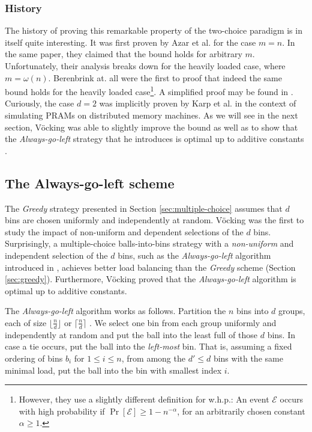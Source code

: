 \documentclass[a4paper,12pt]{article}
\begin{document}
\subsubsection{History}
\label{sec:historyOfGreedy}
The history of proving this remarkable property of the two-choice paradigm is in itself quite interesting. It was first proven by Azar et al. \cite{ABKU99} for the case $m = n$. In the same paper, they claimed that the bound holds for arbitrary $m$. Unfortunately, their analysis breaks down for the heavily loaded case, where $m = \omega\left(n\right)$. Berenbrink at. all \cite{BFZR08} were the first to proof that indeed the same bound holds for the heavily loaded case\footnote{However, they use a slightly different definition for w.h.p.: An event $\mathcal E$ occurs with high probability if $\Pr\left[\mathcal E \right]  \geq 1- n^{-\alpha}$, for an arbitrarily chosen constant $\alpha \geq 1$.}. A simplified proof may be found in \cite{TW13}. Curiously, the case $d = 2$ was implicitly proven by Karp et al. in the context of simulating PRAMs on distributed memory machines\cite{KLM92}. As we will see in the next section, V\"ocking was able to slightly improve the bound as well as to show that the \emph{Always-go-left} strategy that he introduces is optimal up to additive constants \cite{VOC03}.


\subsection{The Always-go-left scheme}
\label{sec:AlwaysGoLeft}
The \emph{Greedy} strategy presented in Section \ref{sec:multiple-choice} assumes that $d$ bins are chosen uniformly and independently at random. V\"ocking \cite{VOC03} was the first to study the impact of non-uniform and dependent selections of the $d$ bins. Surprisingly, a multiple-choice balls-into-bins strategy with a \emph{non-uniform} and independent selection of the $d$ bins, such as the \emph{Always-go-left} algorithm introduced in \cite{VOC03}, achieves better\cite{BCSV06} load balancing than the \emph{Greedy} scheme (Section \ref{sec:greedy}). Furthermore, V\"ocking proved that the \emph{Always-go-left} algorithm is optimal up to additive constants.

The \emph{Always-go-left} algorithm works as follows. Partition the $n$ bins into $d$ groups, each of size $\lfloor \frac{n}{d}\rfloor$ or $\lceil\frac{n}{d}\rceil$ . We select one bin from each group uniformly and independently at random and put the ball into the least full of those $d$ bins. In case a tie occurs, put the ball into the \emph{left-most} bin. That is, assuming a fixed ordering of bins $b_i$ for $1 \leq i \leq n$, from among the $d' \leq d$ bins with the same minimal load, put the ball into the bin with smallest index $i$.
\end{document}
